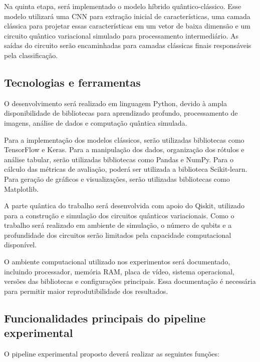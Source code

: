 \documentclass[
    12pt,
    openright,
    oneside,
    a4paper,
    english,
    brazil
]{abntex2}
\begin{document}
Na quinta etapa, será implementado o modelo híbrido quântico-clássico. Esse modelo utilizará uma CNN para extração inicial de características, uma camada clássica para projetar essas características em um vetor de baixa dimensão e um circuito quântico variacional simulado para processamento intermediário. As saídas do circuito serão encaminhadas para camadas clássicas finais responsáveis pela classificação.

\subsection{Tecnologias e ferramentas}
\label{subsec:tecnologias}

O desenvolvimento será realizado em linguagem Python, devido à ampla disponibilidade de bibliotecas para aprendizado profundo, processamento de imagens, análise de dados e computação quântica simulada.

Para a implementação dos modelos clássicos, serão utilizadas bibliotecas como TensorFlow e Keras. Para a manipulação dos dados, organização dos rótulos e análise tabular, serão utilizadas bibliotecas como Pandas e NumPy. Para o cálculo das métricas de avaliação, poderá ser utilizada a biblioteca Scikit-learn. Para geração de gráficos e visualizações, serão utilizadas bibliotecas como Matplotlib.

A parte quântica do trabalho será desenvolvida com apoio do Qiskit, utilizado para a construção e simulação dos circuitos quânticos variacionais. Como o trabalho será realizado em ambiente de simulação, o número de qubits e a profundidade dos circuitos serão limitados pela capacidade computacional disponível.

O ambiente computacional utilizado nos experimentos será documentado, incluindo processador, memória RAM, placa de vídeo, sistema operacional, versões das bibliotecas e configurações principais. Essa documentação é necessária para permitir maior reprodutibilidade dos resultados.

\subsection{Funcionalidades principais do pipeline experimental}
\label{subsec:funcionalidades}

O pipeline experimental proposto deverá realizar as seguintes funções:
\end{document}
